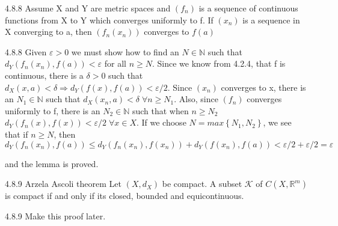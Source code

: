 \documentclass[a4paper,norsk]{article}
\renewcommand{\geq}{\geqslant}
\renewcommand{\leq}{\leqslant}
\renewcommand{\epsilon}{\varepsilon}
\begin{document}
\begin{lemmabox}{4.8.8}{}
Assume X and Y are metric spaces and $ \left( f_n \right)  $ is a sequence of continuous functions from X to Y which converges uniformly to f. If $ \left( x_n \right)  $ is a sequence in X converging to a, then $ \left( f_n(x_n) \right)  $ converges to $ f(a) $ 

\begin{proofbox}{4.8.8}{}
  Given $ \epsilon > 0 $ we must show how to find an $ N \in \mathbb{N} $ such that $ d_Y \left( f_n(x_n), f(a) \right) < \epsilon   $  for all $ n \geq N $. Since we know from 4.2.4, that f is continuous, there is a $ \delta > 0 $ such that $ d_X \left( x, a \right) < \delta  \Rightarrow  d_Y \left( f(x), f(a) \right) < \epsilon /2  $. Since $ \left( x_n \right)   $ converges to x, there is an $ N_1 \in \mathbb{N} $ such that $ d_X \left( x_n, a \right) < \delta \; \forall n \geq N_1 $. Also, since $ \left( f_n \right)  $ converges uniformly to f, there is an $ N_2 \in \mathbb{N} $ such that when $ n \geq N_2 $  $ d_Y \left( f_n(x), f(x) \right) < \epsilon /2 \; \forall x \in X $. If we choose $ N = max \left\{ N_1, N_2 \right\}  $, we see that if $ n \geq N $, then
  \[
      d_Y \left( f_n(x_n), f(a) \right) \leq d_Y \left( f_n(x_n), f(x_n) \right) + d_Y \left( f(x_n), f(a) \right)  < \epsilon /2 + \epsilon /2 = \epsilon 
  \]
  
  and the lemma is proved.
\end{proofbox}
\end{lemmabox}


\begin{theorembox}{4.8.9 Arzela Ascoli theorem}{}
Let $ \left( X, d_X \right)  $ be compact. A subset $ \mathcal{K} $ of $ C \left( X, \mathbb{R}^m \right)  $  is compact if and only if its closed, bounded and equicontinuous.


\begin{proofbox}{4.8.9}{}
  Make this proof later.
\end{proofbox}
\end{theorembox}
\end{document}
